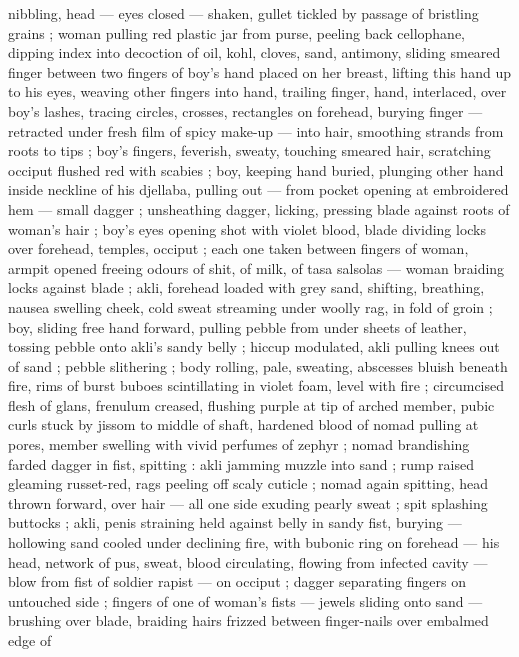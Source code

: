 nibbling, head --- eyes closed --- shaken, gullet tickled by passage 
of bristling grains ; woman pulling red plastic jar from purse, peeling 
back cellophane, dipping index into decoction of oil, kohl, cloves, 
sand, antimony, sliding smeared finger between two fingers of boy's 
hand placed on her breast, lifting this hand up to his eyes, weaving 
other fingers into hand, trailing finger, hand, interlaced, over boy's 
lashes, tracing circles, crosses, rectangles on forehead, burying 
finger --- retracted under fresh film of spicy make-up --- into hair, 
smoothing strands from roots to tips ; boy's fingers, feverish, sweaty, 
touching smeared hair, scratching occiput flushed red with scabies ; 
boy, keeping hand buried, plunging other hand inside neckline of his 
djellaba, pulling out --- from pocket opening at embroidered hem --- 
small dagger ; unsheathing dagger, licking, pressing blade against 
roots of woman's hair ; boy's eyes opening shot with violet blood, 
blade dividing locks over forehead, temples, occiput ; each one taken 
between fingers of woman, armpit opened freeing odours of shit, of 
milk, of tasa salsolas --- woman braiding locks against blade ; akli, 
forehead loaded with grey sand, shifting, breathing, nausea swelling 
cheek, cold sweat streaming under woolly rag, in fold of groin ; boy, 
sliding free hand forward, pulling pebble from under sheets of 
leather, tossing pebble onto akli's sandy belly ; hiccup modulated, 
akli pulling knees out of sand ; pebble slithering ; body rolling, pale, 
sweating, abscesses bluish beneath fire, rims of burst buboes 
scintillating in violet foam, level with fire ; circumcised flesh of glans, 
frenulum creased, flushing purple at tip of arched member, pubic 
curls stuck by jissom to middle of shaft, hardened blood of nomad 
pulling at pores, member swelling with vivid perfumes of zephyr ; 
nomad brandishing farded dagger in fist, spitting : akli jamming 
muzzle into sand ; rump raised gleaming russet-red, rags peeling off 
scaly cuticle ; nomad again spitting, head thrown forward, over hair 
--- all one side exuding pearly sweat ; spit splashing buttocks ; akli, 
penis straining held against belly in sandy fist, burying --- hollowing 
sand cooled under declining fire, with bubonic ring on forehead --- 
his head, network of pus, sweat, blood circulating, flowing from 
infected cavity --- blow from fist of soldier rapist --- on occiput ; 
dagger separating fingers on untouched side ; fingers of one of 
woman's fists --- jewels sliding onto sand --- brushing over blade, 
braiding hairs frizzed between finger-nails over embalmed edge of 
